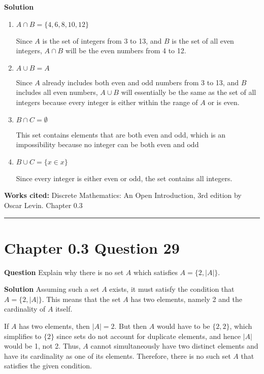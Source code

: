 \documentclass{article}
\begin{document}
\textbf{Solution}
\begin{enumerate}
    \item $A \cap B=\{4,6,8,10,12\}$
    
    Since $A$ is the set of integers from 3 to 13, and $B$ is the set of all even integers, $A \cap B$ will be the even numbers from 4 to 12.
    \item $A \cup B=A$

    Since $A$ already includes both even and odd numbers from 3 to 13, and $B$ includes all even numbers, $A \cup B$ will essentially be the same as the set of all integers because every integer is either within the range of $A$ or is even.

    \item $B \cap C = \emptyset$

    This set contains elements that are both even and odd, which is an impossibility because no integer can be both even and odd

    \item $B \cup C= \{ x \in x \}$
    
    Since every integer is either even or odd, the set contains all integers.
\end{enumerate}

\vspace{0.5cm}
\textbf{Works cited:}
Discrete Mathematics: An Open Introduction, 3rd edition by Oscar Levin. Chapter 0.3

\vspace{0.5cm}
\hrule
\vspace{0.5cm}


\section*{Chapter 0.3 Question 29} 

\textbf{Question}
Explain why there is no set \( A \) which satisfies \( A = \{2, |A|\} \).

\vspace{0.5cm}

\textbf{Solution}
Assuming such a set \( A \) exists, it must satisfy the condition that \( A = \{2, |A|\} \). This means that the set \( A \) has two elements, namely 2 and the cardinality of \( A \) itself. 

If \( A \) has two elements, then \( |A| = 2 \). But then \( A \) would have to be \( \{2, 2\} \), which simplifies to \( \{2\} \) since sets do not account for duplicate elements, and hence \( |A| \) would be 1, not 2. Thus, \( A \) cannot simultaneously have two distinct elements and have its cardinality as one of its elements. Therefore, there is no such set \( A \) that satisfies the given condition.
\end{document}
